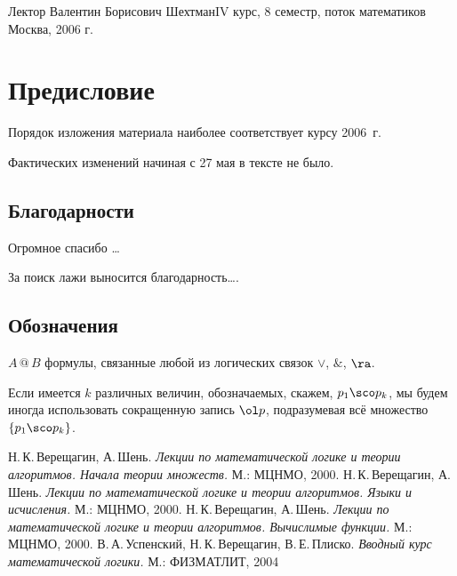 \documentclass[a4paper,draft]{article}
\makeatletter
\let\amper\&
\def\&{\mathbin{\amper}}
\def\atm{\mathbin{@}}
\makeatother
\begin{document}
{Лектор Валентин Борисович Шехтман}{IV курс, 8 семестр, поток математиков}
{Москва, 2006 г.}

\tableofcontents

\pagebreak

\section*{Предисловие}

Порядок изложения материала наиболее соответствует курсу 2006~г.

Фактических изменений начиная с 27 мая в тексте не было.


\subsection*{Благодарности}

Огромное спасибо \dots

За поиск лажи выносится благодарность\dots.

\subsection*{Обозначения}


\begin{items}{-2}
  \item $A \atm B$ формулы, связанные любой из логических связок $\vee$, $\&$, $\ra$.
  \item{} Если имеется $k$ различных величин, обозначаемых, скажем, $p_1\sco
  p_k$, мы будем иногда использовать сокращенную запись $\ol p$,
  подразумевая всё множество $\{p_1\sco p_k\}$.
\end{items}

\medskip
\dmvntrail

\begin{thebibliography}{2}
  \setlength\itemsep{-3pt}
   Н.\,К.\,Верещагин, А.\,Шень. \emph{Лекции по математической логике и теории алгоритмов.
                 Начала теории множеств.} М.: МЦНМО, 2000.
   Н.\,К.\,Верещагин, А.\,Шень. \emph{Лекции по математической логике и теории алгоритмов.
                 Языки и исчисления.} М.: МЦНМО, 2000.
   Н.\,К.\,Верещагин, А.\,Шень. \emph{Лекции по математической логике и теории алгоритмов.
                 Вычислимые функции.} М.: МЦНМО, 2000.
   В.\,А.\,Успенский, Н.\,К.\,Верещагин, В.\,Е.\,Плиско. \emph{Вводный курс математической логики.}
                 М.: ФИЗМАТЛИТ, 2004
\end{thebibliography}
\end{document}
